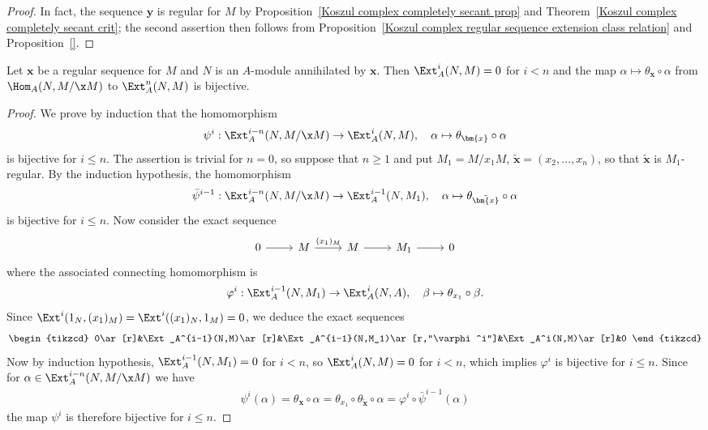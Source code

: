 \begin{proof}
In fact, the sequence $\bm{y}$ is regular for $M$ by Proposition~\ref{Koszul complex completely secant prop} and Theorem~\ref{Koszul complex completely secant crit}; the second assertion then follows from Proposition~\ref{Koszul complex regular sequence extension class relation} and Proposition~\ref{}.
\end{proof}
\begin{proposition}\label{Koszul complex regular sequence extension class and Hom prop}
Let $\bm{x}$ be a regular sequence for $M$ and $N$ is an $A$-module annihilated by $\bm{x}$. Then $\Ext_A^i(N,M)=0$ for $i<n$ and the map $\alpha\mapsto\theta_{\bm{x}}\circ\alpha$ from $\Hom_A(N,M/\x M)$ to $\Ext_A^n(N,M)$ is bijective.
\end{proposition}
\begin{proof}
We prove by induction that the homomorphism
\[\psi^i:\Ext_A^{i-n}(N,M/\x M)\to\Ext_A^i(N,M),\quad\alpha\mapsto\theta_{\bm{x}}\circ\alpha\]
is bijective for $i\leq n$. The assertion is trivial for $n=0$, so suppose that $n\geq 1$ and put $M_1=M/x_1M$, $\tilde{\bm{x}}=(x_2,\dots,x_n)$, so that $\tilde{\bm{x}}$ is $M_1$-regular. By the induction hypothesis, the homomorphism
\[\bar{\psi}^{i-1}:\Ext_A^{i-n}(N,M/\x M)\to\Ext_A^{i-1}(N,M_1),\quad \alpha\mapsto\theta_{\tilde{\bm{x}}}\circ\alpha\]
is bijective for $i\leq n$. Now consider the exact sequence
\[\begin{tikzcd}
0\ar[r]&M\ar[r,"(x_1)_M"]&M\ar[r]&M_1\ar[r]&0
\end{tikzcd}\]
where the associated connecting homomorphism is
\[\varphi^i:\Ext_A^{i-1}(N,M_1)\to\Ext_A^i(N,A),\quad \beta\mapsto\theta_{x_1}\circ\beta.\]
Since $\Ext^i(1_N,(x_1)_M)=\Ext^i((x_1)_N,1_M)=0$, we deduce the exact sequences
\[\begin{tikzcd}
0\ar[r]&\Ext_A^{i-1}(N,M)\ar[r]&\Ext_A^{i-1}(N,M_1)\ar[r,"\varphi^i"]&\Ext_A^i(N,M)\ar[r]&0
\end{tikzcd}\]
Now by induction hypothesis, $\Ext_A^{i-1}(N,M_1)=0$ for $i<n$, so $\Ext_A^i(N,M)=0$ for $i<n$, which implies $\varphi^i$ is bijective for $i\leq n$. Since for $\alpha\in\Ext_A^{i-n}(N,M/\x M)$ we have
\begin{align}\label{Koszul complex regular sequence extension class and Hom prop-1}
\psi^i(\alpha)=\theta_{\bm{x}}\circ\alpha=\theta_{x_1}\circ\theta_{\tilde{\bm{x}}}\circ\alpha=\varphi^i\circ\bar{\psi}^{i-1}(\alpha)
\end{align}
the map $\psi^i$ is therefore bijective for $i\leq n$.
\end{proof}